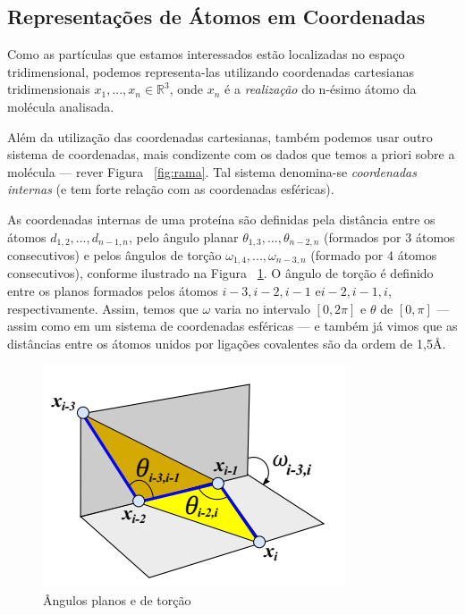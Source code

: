 \documentclass[a4paper,12pt]{article}
\begin{document}
	\subsection{Representações de Átomos em Coordenadas\label{sec:bi}}
	Como as partículas que estamos interessados estão localizadas no espaço tridimensional, podemos representa-las utilizando coordenadas cartesianas tridimensionais $x_1, ...,x_n \in\mathbb{R}^3$, onde $x_n$ é a \textit{realização} do n-ésimo átomo da molécula analisada. 
	
	Além da utilização das coordenadas cartesianas, também podemos usar outro sistema de coordenadas, mais condizente com os dados que temos a priori sobre a molécula --- rever Figura ~\ref{fig:rama}. Tal sistema denomina-se \textit{coordenadas internas} (e tem forte relação com as coordenadas esféricas).
	
	As coordenadas internas de uma proteína são definidas pela distância entre os átomos $d_{1,2}, ..., d_{n - 1,n}$, pelo ângulo planar $\theta_{1,3}, ...,\theta_{n - 2,n}$ (formados por 3 átomos consecutivos) e pelos ângulos de torção $\omega_{1,4}, ..., \omega_{n-3,n}$ (formado por 4 átomos consecutivos), conforme ilustrado na Figura ~\ref{fig:angulos}. O ângulo de torção é definido entre os planos formados pelos átomos $i-3,i-2,i-1$ e$i-2,i-1,i$, respectivamente. Assim, temos que $\omega$ varia no intervalo $[0,2\pi]$ e $\theta$ de $[0,\pi]$ --- assim como em um sistema de coordenadas esféricas --- e também já vimos que as distâncias entre os átomos unidos por ligações covalentes são da ordem de 1,5\AA. 
	
	\begin{figure}[H]
		\begin{center}
			\includegraphics[width=0.6\linewidth]{Capturar.PNG}
		\end{center}
		\caption{Ângulos planos e de torção \cite{carlileBook31Coloquio}}
		\label{fig:angulos}
	\end{figure}
	
\end{document}
